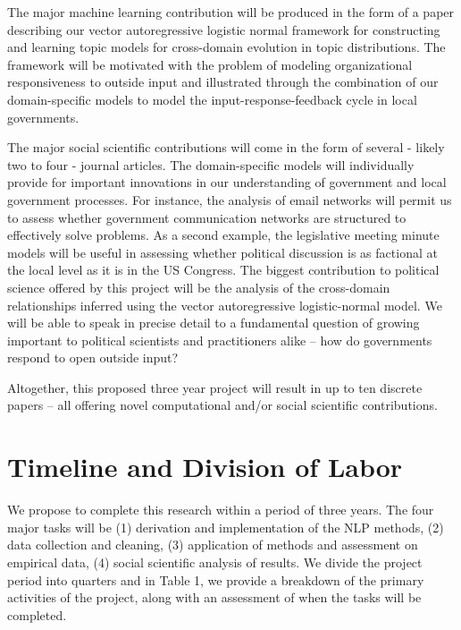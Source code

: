 The major machine learning contribution will be produced in the form of a paper describing our vector autoregressive logistic normal framework for constructing and learning topic models for cross-domain evolution in topic distributions. The framework will be motivated with the problem of modeling organizational responsiveness to outside input and illustrated through the combination of our domain-specific models to model the input-response-feedback cycle in local governments.

The major social scientific contributions will come in the form of several - likely two to four - journal articles. The domain-specific models will individually provide for important innovations in our understanding of government and local government processes. For instance, the analysis of email networks will permit us to assess whether government communication networks are structured to effectively solve problems. As a second example, the legislative meeting minute models will be useful in assessing whether political discussion is as factional at the local level as it is in the US Congress. The biggest contribution to political science offered by this project will be the analysis of the cross-domain relationships inferred using the vector autoregressive logistic-normal model. We will be able to speak in precise detail to a fundamental question of growing important to political scientists and practitioners alike -- how do governments respond to open outside input? 

Altogether, this proposed three year project will result in up to ten discrete papers -- all offering novel computational and/or social scientific contributions.

\section{Timeline and Division of Labor}

We propose to complete this research within a period of three years. The four major tasks will be (1) derivation and implementation of the NLP methods, (2) data collection and cleaning, (3) application of methods and assessment on empirical data, (4) social scientific analysis of results. We divide the project period into quarters and in Table 1, we provide a breakdown of the primary activities of the project, along with an assessment of when the tasks will be completed.


